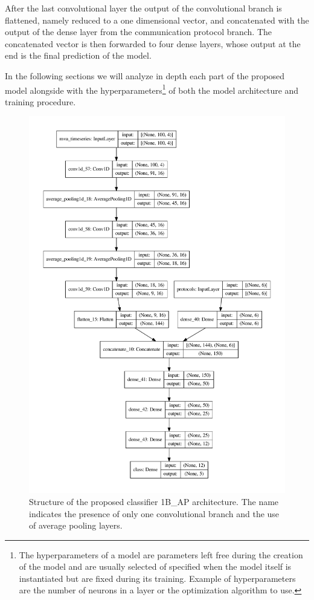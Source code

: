 After the last convolutional layer the output of the convolutional branch is flattened, namely reduced to a one dimensional vector, and concatenated with the output of the dense layer from the communication protocol branch. The concatenated vector is then forwarded to four dense layers,  whose output at the end is the final prediction of the model. 

In the following sections we will analyze in depth each part of the proposed model alongside with the hyperparameters\footnote{The hyperparameters of a model are parameters left free during the creation of the model and are usually selected of specified when the model itself is instantiated but are fixed during its training. Example of hyperparameters are the number of neurons in a layer or the optimization algorithm to use.} of both the model architecture and training procedure.


\begin{figure}
    \centering
\includegraphics[height=0.95\textheight]{images/models/model_1bap.pdf}
\caption{{Structure of the proposed classifier 1B\_AP architecture. The name indicates the presence of only one convolutional branch and the use of average pooling layers.}}
    \label{fig:1b_model}
\end{figure}


